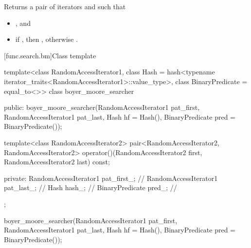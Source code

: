 \begin{itemdescr}
\pnum
\effects
Returns a pair of iterators  and  such that
\begin{itemize}
\item {}, and
\item if , then ,
otherwise .
\end{itemize}
\end{itemdescr}

[func.search.bm]{Class template }

%
\begin{codeblock}
template<class RandomAccessIterator1,
         class Hash = hash<typename iterator_traits<RandomAccessIterator1>::value_type>,
         class BinaryPredicate = equal_to<>>
  class boyer_moore_searcher {
  public:
    boyer_moore_searcher(RandomAccessIterator1 pat_first,
                         RandomAccessIterator1 pat_last,
                         Hash hf = Hash(),
                         BinaryPredicate pred = BinaryPredicate());

    template<class RandomAccessIterator2>
      pair<RandomAccessIterator2, RandomAccessIterator2>
        operator()(RandomAccessIterator2 first, RandomAccessIterator2 last) const;

  private:
    RandomAccessIterator1 pat_first_;   // \expos
    RandomAccessIterator1 pat_last_;    // \expos
    Hash hash_;                         // \expos
    BinaryPredicate pred_;              // \expos
  };
\end{codeblock}

%
\begin{itemdecl}
boyer_moore_searcher(RandomAccessIterator1 pat_first,
                     RandomAccessIterator1 pat_last,
                     Hash hf = Hash(),
                     BinaryPredicate pred = BinaryPredicate());
\end{itemdecl}

